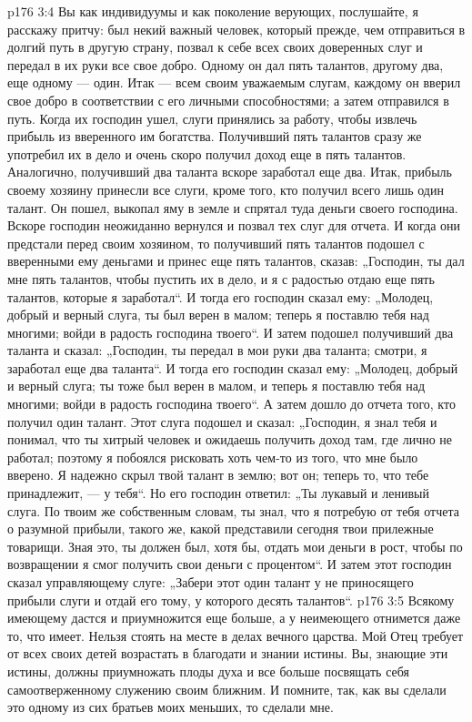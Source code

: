 \vs p176 3:4 Вы как индивидуумы и как поколение верующих, послушайте, я расскажу притчу: был некий важный человек, который прежде, чем отправиться в долгий путь в другую страну, позвал к себе всех своих доверенных слуг и передал в их руки все свое добро. Одному он дал пять талантов, другому два, еще одному --- один. Итак --- всем своим уважаемым слугам, каждому он вверил свое добро в соответствии с его личными способностями; а затем отправился в путь. Когда их господин ушел, слуги принялись за работу, чтобы извлечь прибыль из вверенного им богатства. Получивший пять талантов сразу же употребил их в дело и очень скоро получил доход еще в пять талантов. Аналогично, получивший два таланта вскоре заработал еще два. Итак, прибыль своему хозяину принесли все слуги, кроме того, кто получил всего лишь один талант. Он пошел, выкопал яму в земле и спрятал туда деньги своего господина. Вскоре господин неожиданно вернулся и позвал тех слуг для отчета. И когда они предстали перед своим хозяином, то получивший пять талантов подошел с вверенными ему деньгами и принес еще пять талантов, сказав: „Господин, ты дал мне пять талантов, чтобы пустить их в дело, и я с радостью отдаю еще пять талантов, которые я заработал“. И тогда его господин сказал ему: „Молодец, добрый и верный слуга, ты был верен в малом; теперь я поставлю тебя над многими; войди в радость господина твоего“. И затем подошел получивший два таланта и сказал: „Господин, ты передал в мои руки два таланта; смотри, я заработал еще два таланта“. И тогда его господин сказал ему: „Молодец, добрый и верный слуга; ты тоже был верен в малом, и теперь я поставлю тебя над многими; войди в радость господина твоего“. А затем дошло до отчета того, кто получил один талант. Этот слуга подошел и сказал: „Господин, я знал тебя и понимал, что ты хитрый человек и ожидаешь получить доход там, где лично не работал; поэтому я побоялся рисковать хоть чем\hyp{}то из того, что мне было вверено. Я надежно скрыл твой талант в землю; вот он; теперь то, что тебе принадлежит, --- у тебя“. Но его господин ответил: „Ты лукавый и ленивый слуга. По твоим же собственным словам, ты знал, что я потребую от тебя отчета о разумной прибыли, такого же, какой представили сегодня твои прилежные товарищи. Зная это, ты должен был, хотя бы, отдать мои деньги в рост, чтобы по возвращении я смог получить свои деньги с процентом“. И затем этот господин сказал управляющему слуге: „Забери этот один талант у не приносящего прибыли слуги и отдай его тому, у которого десять талантов“.
\vs p176 3:5 Всякому имеющему дастся и приумножится еще больше, а у неимеющего отнимется даже то, что имеет. Нельзя стоять на месте в делах вечного царства. Мой Отец требует от всех своих детей возрастать в благодати и знании истины. Вы, знающие эти истины, должны приумножать плоды духа и все больше посвящать себя самоотверженному служению своим ближним. И помните, так, как вы сделали это одному из сих братьев моих меньших, то сделали мне.
